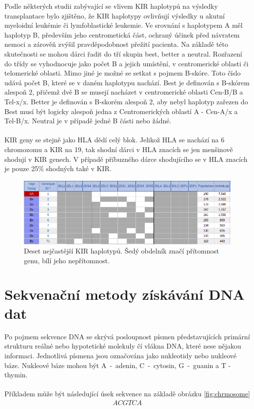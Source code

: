 \documentclass[czech,DP]{thesiskiv}
\numberwithin{equation}{section}
\begin{document}
\noindent
Podle některých studii zabývající se vlivem KIR haplotypů na výsledky transplantace bylo zjištěno, že KIR haplotypy ovlivňují výsledky u akutní myeloidní leukémie či  lymfoblastické leukemie. Ve srovnání s haplotypem A měl haplotyp B, především jeho centrometická část, ochraný účinek před návratem nemoci a zárověň zvýšil pravděpodobnost přežití pacienta. Na základě této skutečnosti se mohou dárci řadit do tří skupin best, better a neutral. Rozřazení do třídy se vyhodnocuje jako počet B a jejich umístění, v centromerické oblasti či telomerické oblasti. Mimo jiné je možné se setkat s pojmem B-skóre. Toto číslo udává počet B, které se v daném haplotypu nachází. Best je definován s B-skórem alespoň 2, přičemž dvě B se musejí nacházet v centromerické oblasti Cen-B/B a Tel-x/x. Better je definován s B-skorém alespoň 2, aby nebyl haplotyp zařezen do Best musí být logicky alespoň jedna z Centromerických oblastí A - Cen-A/x a Tel-B/x. Neutral je v případě jedné B části nebo žádné. \cite{KIR_haplotypy}
\\
\\
KIR geny se stejně jako HLA dědí celý blok. Jelikož HLA se nachází na 6 chromozomu a KIR na 19, tak shodní dárci v HLA znacích se jen menšinově shodují v KIR genech. V případě příbuzného dárce shodujícího se v HLA znacích je pouze 25\% shodných také v KIR. \cite{KIR_haplotypy}

\begin{figure}[H]		
		\centering
		\includegraphics[width=\textwidth]{./img/KIR_haplotypy_priklad.png}
		\caption{Deset nejčastější KIR haplotypů. Šedý obdelník značí přítomnost genu, bílí jeho nepřítomnost. \cite{kir_genotypes_10}}
		\label{fig:kir_haplotypy_10}
\end{figure}
 

\chapter{Sekvenační metody získávání DNA dat}
Po pojmem sekvence DNA se skrývá posloupnost písmen představujících primární strukturu reálné nebo hypotetické molekuly čí vlákna DNA, které nese nějakou informaci. Jednotlivá písmena jsou označována jako nukleotidy nebo nukleové báze. Nukleové báze mohou být A~-~adenin, C~-~cytosin, G~-~guanin a T - thymin. \cite{genome_gov}
\\
\\
\noindent
Příkladem může být následující úsek sekvence na základě obrázku \ref{fig:chrmosome} 
\begin{align}
   \label{sekvence_prikad} ACGTCA
\end{align}
\end{document}
